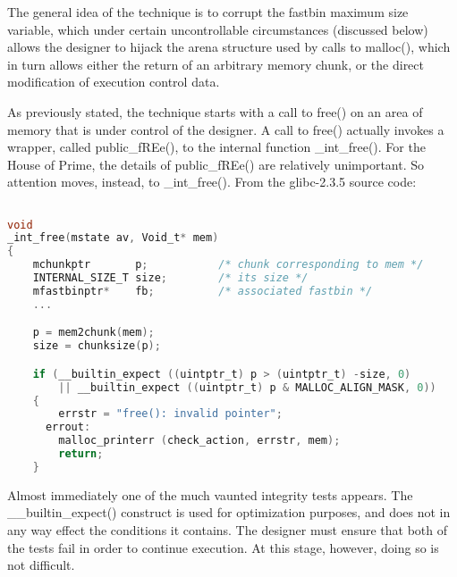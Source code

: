 \documentclass[12pt]{article}
\begin{document}
The general idea of the technique is to corrupt the fastbin maximum
size variable, which under certain uncontrollable circumstances
(discussed below) allows the designer to hijack the arena structure
used by calls to malloc(), which in turn allows either the return
of an arbitrary memory chunk, or the direct modification of
execution control data.

As previously stated, the technique starts with a call to free() on
an area of memory that is under control of the designer. A call to
free() actually invokes a wrapper, called public\_fREe(), to the
internal function \_int\_free(). For the House of Prime, the details
of public\_fREe() are relatively unimportant. So attention moves,
instead, to \_int\_free(). From the glibc-2.3.5 source code:
\begin{lstlisting}[language=C]

void
_int_free(mstate av, Void_t* mem)
{
    mchunkptr       p;           /* chunk corresponding to mem */
    INTERNAL_SIZE_T size;        /* its size */
    mfastbinptr*    fb;          /* associated fastbin */
    ...

    p = mem2chunk(mem);
    size = chunksize(p);

    if (__builtin_expect ((uintptr_t) p > (uintptr_t) -size, 0)
        || __builtin_expect ((uintptr_t) p & MALLOC_ALIGN_MASK, 0))
    {
        errstr = "free(): invalid pointer";
      errout:
        malloc_printerr (check_action, errstr, mem);
        return;
    }
\end{lstlisting}
Almost immediately one of the much vaunted integrity tests appears.
The \_\_builtin\_expect() construct is used for optimization purposes,
and does not in any way effect the conditions it contains. The
designer must ensure that both of the tests fail in order to
continue execution. At this stage, however, doing so is not
difficult.
\end{document}

